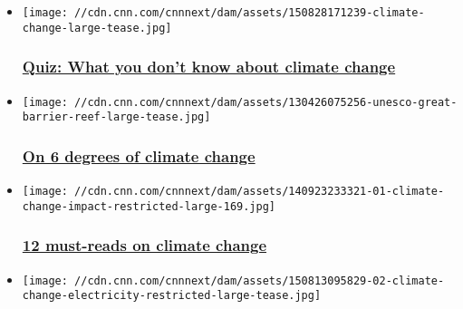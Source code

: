 \begin{itemize}
\item
  \href{http://www.cnn.com/interactive/2015/08/opinions/climate-change-quiz/}{}

  \texttt{[image: //cdn.cnn.com/cnnnext/dam/assets/150828171239-climate-change-large-tease.jpg]}

  \hypertarget{quiz-what-you-dont-know-about-climate-change}{%
  \subsubsection{\texorpdfstring{\href{http://www.cnn.com/interactive/2015/08/opinions/climate-change-quiz/}{Quiz:
  What you don't know about climate
  change}}{Quiz: What you don't know about climate change}}\label{quiz-what-you-dont-know-about-climate-change}}
\item
  \href{/2015/05/21/opinions/sutter-6-degrees-climate/index.html}{}

  \texttt{[image: //cdn.cnn.com/cnnnext/dam/assets/130426075256-unesco-great-barrier-reef-large-tease.jpg]}

  \hypertarget{on-6-degrees-of-climate-change}{%
  \subsubsection{\texorpdfstring{\href{/2015/05/21/opinions/sutter-6-degrees-climate/index.html}{On
  6 degrees of climate
  change}}{On 6 degrees of climate change}}\label{on-6-degrees-of-climate-change}}
\item
  \href{/2015/05/19/opinions/sutter-2-degrees-book-club/index.html}{}

  \texttt{[image: //cdn.cnn.com/cnnnext/dam/assets/140923233321-01-climate-change-impact-restricted-large-169.jpg]}

  \hypertarget{12-must-reads-on-climate-change}{%
  \subsubsection{\texorpdfstring{\href{/2015/05/19/opinions/sutter-2-degrees-book-club/index.html}{12
  must-reads on climate
  change}}{12 must-reads on climate change}}\label{12-must-reads-on-climate-change}}
\item
  \href{/2015/08/13/opinions/gallery/top-climate-change-contributors/index.html}{}

  \texttt{[image: //cdn.cnn.com/cnnnext/dam/assets/150813095829-02-climate-change-electricity-restricted-large-tease.jpg]}


\end{itemize}
